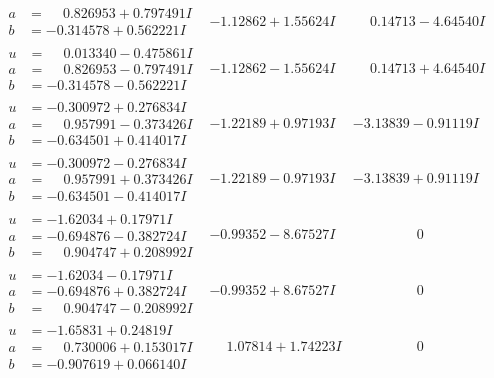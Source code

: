 \documentclass[1p]{elsarticle_modified}
\theoremstyle{definition}
\begin{document}
$$\begin{array}{c|c|c}
\begin{aligned}
a &= \phantom{-}0.826953 + 0.797491 I \\
b &= -0.314578 + 0.562221 I\end{aligned}
 & -1.12862 + 1.55624 I & \phantom{-}0.14713 - 4.64540 I \\ \hline\begin{aligned}
u &= \phantom{-}0.013340 - 0.475861 I \\
a &= \phantom{-}0.826953 - 0.797491 I \\
b &= -0.314578 - 0.562221 I\end{aligned}
 & -1.12862 - 1.55624 I & \phantom{-}0.14713 + 4.64540 I \\ \hline\begin{aligned}
u &= -0.300972 + 0.276834 I \\
a &= \phantom{-}0.957991 - 0.373426 I \\
b &= -0.634501 + 0.414017 I\end{aligned}
 & -1.22189 + 0.97193 I & -3.13839 - 0.91119 I \\ \hline\begin{aligned}
u &= -0.300972 - 0.276834 I \\
a &= \phantom{-}0.957991 + 0.373426 I \\
b &= -0.634501 - 0.414017 I\end{aligned}
 & -1.22189 - 0.97193 I & -3.13839 + 0.91119 I \\ \hline\begin{aligned}
u &= -1.62034 + 0.17971 I \\
a &= -0.694876 - 0.382724 I \\
b &= \phantom{-}0.904747 + 0.208992 I\end{aligned}
 & -0.99352 - 8.67527 I & \phantom{-0.000000 } 0 \\ \hline\begin{aligned}
u &= -1.62034 - 0.17971 I \\
a &= -0.694876 + 0.382724 I \\
b &= \phantom{-}0.904747 - 0.208992 I\end{aligned}
 & -0.99352 + 8.67527 I & \phantom{-0.000000 } 0 \\ \hline\begin{aligned}
u &= -1.65831 + 0.24819 I \\
a &= \phantom{-}0.730006 + 0.153017 I \\
b &= -0.907619 + 0.066140 I\end{aligned}
 & \phantom{-}1.07814 + 1.74223 I & \phantom{-0.000000 } 0 \\ \hline\begin{aligned}

\end{aligned}
\end{array}$$
\end{document}
